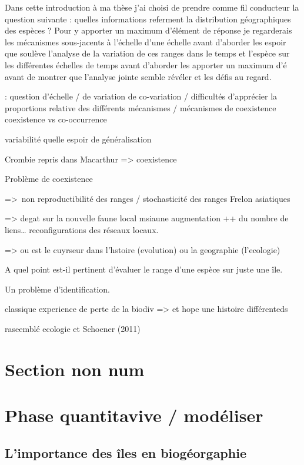 Dans cette introduction à ma thèse j'ai choisi de prendre comme fil
conducteur la question suivante : quelles informations referment la
distribution géographiques des espèces ? Pour y apporter un maximum
d'élément de réponse je regarderais les mécanismes sous-jacents à
l'échelle d'une échelle avant d'aborder les espoir que soulève l'analyse
de la variation de ces ranges dans le temps et l'espèce sur les
différentes échelles de temps avant d'aborder les apporter un maximum
d'é avant de montrer que l'analyse jointe semble révéler et les défis au
regard.

: question d'échelle / de variation de co-variation / difficultés
d'apprécier la proportions relative des différents mécanismes /
mécanismes de coexistence coexistence vs co-occurrence

variabilité quelle espoir de généralisation

Crombie repris dans Macarthur =\textgreater{} coexistence

Problème de coexistence

=\textgreater{}~non reproductibilité des ranges / stochasticité des
ranges Frelon asiatiques

=\textgreater{} degat sur la nouvelle faune local msiaune augmentation
++ du nombre de liens\ldots{} reconfigurations des réseaux locaux.

=\textgreater{} ou est le cuyrseur dans l'hstoire (evolution) ou la
geographie (l'ecologie)

A quel point est-il pertinent d'évaluer le range d'une espèce sur juste
une île.

Un problème d'identification.

classique experience de perte de la biodiv =\textgreater{} et hope une
histoire différenteds

raseemblé ecologie et Schoener (2011)

\section*{Section non num}\label{section-non-num}

\section{Phase quantitavive /
modéliser}\label{phase-quantitavive-moduxe9liser}

\subsection{L'importance des îles en
biogéorgaphie}\label{limportance-des-uxeeles-en-bioguxe9orgaphie}

